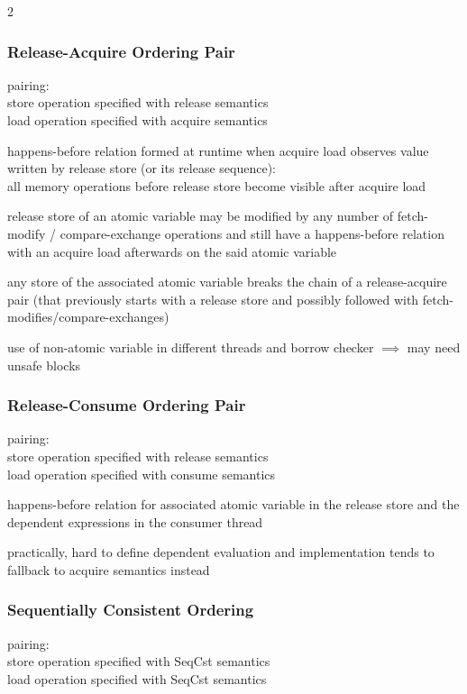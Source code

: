 \documentclass[8pt]{extarticle}
\begin{document}
\begin{multicols*}{2}
    \subsubsection{Release-Acquire Ordering Pair}
    pairing:\\
    store operation specified with release semantics\\
    load operation specified with acquire semantics

    happens-before relation formed at runtime when acquire load observes value written by release store (or its release sequence):\\
    all memory operations before release store become visible after acquire load

    release store of an atomic variable may be modified by any number of fetch-modify / compare-exchange operations and still have a happens-before relation with an acquire load afterwards on the said atomic variable

    any store of the associated atomic variable breaks the chain of a release-acquire pair (that previously starts with a release store and possibly followed with fetch-modifies/compare-exchanges)

    use of non-atomic variable in different threads and borrow checker $\implies$ may need unsafe blocks
    
    \subsubsection{Release-Consume Ordering Pair}

    pairing:\\
    store operation specified with release semantics\\
    load operation specified with consume semantics

    happens-before relation for associated atomic variable in the release store and the dependent expressions in the consumer thread

    practically, hard to define dependent evaluation and implementation tends to fallback to acquire semantics instead
    
    \subsubsection{Sequentially Consistent Ordering}

    pairing:\\
    store operation specified with SeqCst semantics\\
    load operation specified with SeqCst semantics


\end{multicols*}
\end{document}
